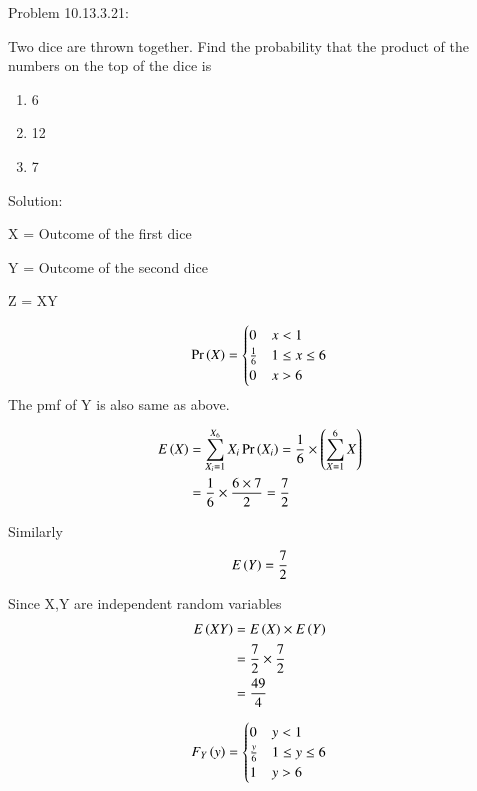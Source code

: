 \documentclass[journal,12pt,twocolumn]{IEEEtran}
\begin{document}
%
Problem 10.13.3.21:

Two dice are thrown together. Find the probability that the product of the numbers
on the top of the dice is
\begin{enumerate}
\item 6
\item 12
\item 7
\end{enumerate}
Solution:

X = Outcome of the first dice

Y = Outcome of the second dice

Z = XY

\begin{align}
\Pr\left(X\right)=
	\begin{cases}
		0 & x < 1\\
		\frac{1}{6} & 1 \leq x \leq 6\\
		0 & x > 6
	\end{cases}
\end{align}
The pmf of Y is also same as above.

\begin{align}
E\left(X\right)&=\sum_{X_i=1}^{X_6} X_i\Pr\left(X_i\right)=\frac{1}{6}\times\left(\sum_{X=1}^{6} X\right)\\
&=\frac{1}{6}\times\frac{6\times7}{2}=\frac{7}{2}
\end{align}

Similarly
\begin{align}
E\left(Y\right)=\frac{7}{2}
\end{align}

Since X,Y are independent random variables
\begin{align}
E\left(XY\right)&=E\left(X\right)\times E\left(Y\right)\\
&=\frac{7}{2}\times\frac{7}{2}\\
&=\frac{49}{4}
\end{align}

\begin{align}
F_Y\left(y\right)=
	\begin{cases}
		0 & y < 1\\
		\frac{y}{6} & 1 \leq y \leq 6\\
		1 & y > 6
	\end{cases}
\end{align}
\end{document}
